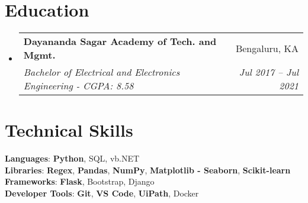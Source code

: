 \documentclass[letterpaper,11pt]{article}
\makeatletter
\newcommand{\resumeSubheading}[4]{
  \vspace{-2pt}\item
    \begin{tabular*}{0.97\textwidth}[t]{l@{\extracolsep{\fill}}r}
      \textbf{#1} & #2 \\
      \textit{\small#3} & \textit{\small #4} \\
    \end{tabular*}\vspace{-7pt}
}
\newcommand{\resumeSubHeadingListStart}{\begin{itemize}[leftmargin=0.15in, label={}]}
\newcommand{\resumeSubHeadingListEnd}{\end{itemize}}
\makeatother
\begin{document}
\section{Education}
  \resumeSubHeadingListStart
    \resumeSubheading
      {Dayananda Sagar Academy of Tech. and Mgmt.}{Bengaluru, KA}
      {Bachelor of Electrical and Electronics Engineering - CGPA: 8.58}{Jul 2017 -- Jul 2021}
  \resumeSubHeadingListEnd

\section{Technical Skills}
 \begin{itemize}[leftmargin=0.15in, label={}]
    \small{\item{
     \textbf{Languages}{: {\bfseries{Python}}, 
                          {SQL}, 
                          {vb.NET}} \\
     \textbf{Libraries}{: {\bfseries{Regex}}, 
                          {\bfseries{Pandas}}, 
                          {\bfseries{NumPy}},
                          {\bfseries{Matplotlib - Seaborn}},
                          {\bfseries{Scikit-learn}}}\\
     \textbf{Frameworks}{: {\bfseries{Flask}},
                          {Bootstrap},
                          {Django}} \\
     \textbf{Developer Tools}{: 
                          {\bfseries{Git}},
                          {\bfseries{VS Code}},
                          {\bfseries{UiPath}}, 
                          {Docker}} \\
    }}
 \end{itemize}
\vspace{-10pt}

\end{document}
